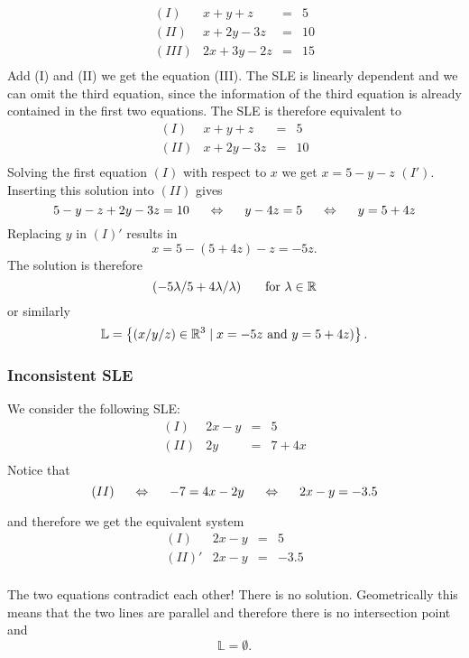 \begin{example}

\[
\begin{array}{lrcl}
(I)&x+y+z&=&5\\
(II)&x+2y-3z&=&10\\
(III)&2x+3y-2z&=&15\\
\end{array}
\]
Add (I) and (II) we get the equation (III). The SLE is linearly dependent and we can omit the third equation, since the information of the third equation is already contained in the first two equations. The SLE is therefore equivalent to
\[
\begin{array}{lrcl}
(I)&x+y+z&=&5\\
(II)&x+2y-3z&=&10\\
\end{array}
\]
Solving the first equation $(I)$ with respect to $x$ we get $x=5-y-z$ $(I')$. Inserting this solution into $(II)$ gives
\[
5-y-z+2y-3z=10 \hspace{5mm}\Leftrightarrow\hspace{5mm} y-4z=5 \hspace{5mm}\Leftrightarrow\hspace{5mm} y=5+4z
\]
Replacing $y$ in $(I)'$ results in
\[
x=5-(5+4z)-z=-5z.
\]
The solution is therefore 
\[
\left(-5\lambda / 5+4\lambda / \lambda \right) \hspace{5mm}\text{ for } \lambda \in \mathbb{R}
\]
or similarly
\[
\mathbb{L}=\left\{(x/y/z)\in \mathbb{R}^3\mid x=-5z \text{ and } y=5+4z)\right\}.
\]

\end{example}
\vsp



\subsubsection{Inconsistent SLE}
We consider the following SLE:
\[
\begin{array}{lrcl}
(I)&2x-y&=&5\\
(II)&2y&=&7+4x\\
\end{array}
\]
Notice that
\[
(II) \hspace{5mm}\Leftrightarrow\hspace{5mm} -7=4x-2y \hspace{5mm}\Leftrightarrow\hspace{5mm} 2x-y=-3.5
\]

and therefore we get the equivalent system
\[
\begin{array}{lrcl}
(I)&2x-y&=&5\\
(II)'&2x-y&=&-3.5\\
\end{array}
\]

The two equations contradict each other! There is no solution. Geometrically this means that the two lines are parallel and therefore there is no intersection point and 
\[
\mathbb{L}=\emptyset.
\]


